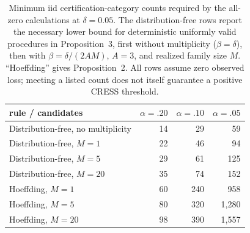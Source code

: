 \begin{table}[t]
\centering
\caption{Minimum iid certification-category counts required by the all-zero calculations at $\delta=0.05$. The distribution-free rows report the necessary lower bound for deterministic uniformly valid procedures in Proposition~3, first without multiplicity ($\beta=\delta$), then with $\beta=\delta/(2AM)$, $A=3$, and realized family size $M$. ``Hoeffding'' gives Proposition~2. All rows assume zero observed loss; meeting a listed count does not itself guarantee a positive CRESS threshold.}
\label{tab:certificate-feasibility}
\footnotesize
\setlength{\tabcolsep}{4pt}
\begin{tabular}{lrrr}
\toprule
rule / candidates & $\alpha=.20$ & $\alpha=.10$ & $\alpha=.05$ \\
\midrule
Distribution-free, no multiplicity & 14 & 29 & 59 \\
\midrule
Distribution-free, $M=1$  & 22 & 46 & 94 \\
Distribution-free, $M=5$  & 29 & 61 & 125 \\
Distribution-free, $M=20$ & 35 & 74 & 152 \\
\midrule
Hoeffding, $M=1$  & 60 & 240 & 958 \\
Hoeffding, $M=5$  & 80 & 320 & 1,280 \\
Hoeffding, $M=20$ & 98 & 390 & 1,557 \\
\bottomrule
\end{tabular}
\end{table}
